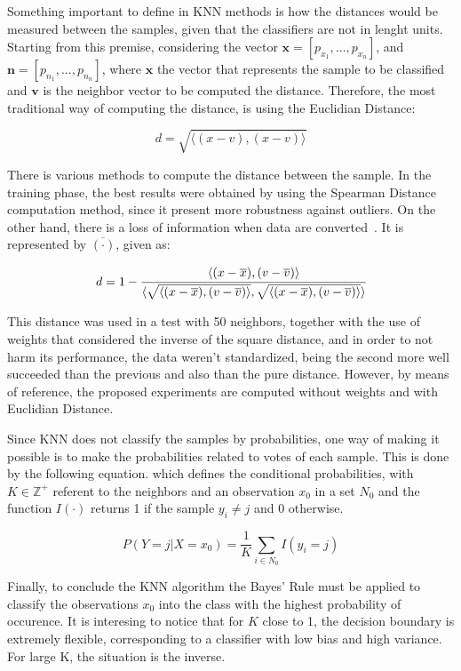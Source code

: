 Something important to define in KNN methods is how the distances would be measured between
the samples, given that the classifiers are not in lenght units. Starting from this premise,
considering the vector $\textbf{x} = [p_{x_1}, ..., p_{x_n}]$, and $\textbf{n} = [p_{n_1}, ..., p_{n_n}]$, 
where $\textbf{x}$ the vector that represents the sample to be classified and $\textbf{v}$
is the neighbor vector to be computed the distance. Therefore, the most traditional way 
of computing the distance, is using the Euclidian Distance:

\begin{equation}
    d = \sqrt{\langle (x-v), (x-v)\rangle} \label{eq16}
\end{equation}

There is various methods to compute the distance between the sample. In the training phase, the best results were obtained by using the Spearman Distance computation
method, since it present more robustness against outliers. On the other hand, there is a loss of information when data are converted~\cite{Kumar2014}. It is represented by $\overline{(\cdot)}$,
given as: 

\begin{equation}
    d = 1 - \cfrac{\langle (x-\overline{x}), (v - \overline{v})\rangle}{\langle \sqrt{\langle (x-\overline{x}), (v - \overline{v})\rangle}, \sqrt{\langle (x-\overline{x}), (v - \overline{v})\rangle}\rangle}
\end{equation}

This distance was used in a test with 50 neighbors, together with the use of weights that
considered the inverse of the square distance, and in order to not harm its performance, 
the data weren't standardized, being the second more well succeeded than
the previous and also than the pure distance. However, by means of reference, the proposed 
experiments are computed without weights and with Euclidian Distance.

Since KNN does not classify the samples by probabilities, one way of making it possible is to 
make the probabilities related to votes of each sample. This is done by the following 
equation. which defines the conditional probabilities, with $K \in \mathbb{Z}^{+}$ referent 
to the neighbors and an observation $x_0$ in a set $N_0$ and the function $I(\cdot)$
returns 1 if the sample $y_i \neq j$ and 0 otherwise.

\begin{equation}
    P(Y = j|X = x_0) = \frac{1}{K} \sum_{i \in N_0} I(y_i = j) 
\end{equation}

Finally, to conclude the KNN algorithm the Bayes' Rule must be applied to classify the 
observations $x_0$ into the class with the highest probability of occurence. It is 
interesing to notice that for $K$ close to 1, the decision boundary is extremely 
flexible, corresponding to a classifier with low bias and high variance. For large K, the situation is the inverse.